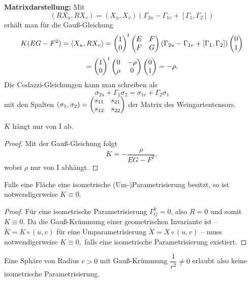 \textbf{Matrixdarstellung:} Mit 
		\[ (RX_u,RX_v)= (X_u,X_v)(\Gamma_{2u}-\Gamma_{1v} + [\Gamma_{1},\Gamma_{2}]) \] 
	erhält man für die Gauß-Gleichung 
		\[ K(EG-F^2) = \left \langle X_u,RX_v \right\rangle = \begin{pmatrix} 1 \\ 0 \end{pmatrix}^t\begin{pmatrix} E & F \\ F & G \end{pmatrix} ( \Gamma_{2u}-\Gamma_{1v} + [\Gamma_{1},\Gamma_{2}]) \begin{pmatrix} 0 \\ 1 \end{pmatrix} \]
		\[= \begin{pmatrix} 1 \\ 0 \end{pmatrix}^t \begin{pmatrix}  0 &- \rho \\ \rho & 0 \end{pmatrix} \begin{pmatrix} 0 \\ 1 \end{pmatrix} = -\rho. \] 
	Die Codazzi-Gleichungen kann man schreiben als 
		\[ \sigma_{2u}+\Gamma_{1}\sigma_{2} = \sigma_{1v}+\Gamma_{2}\sigma_{1} \]
	mit den Spalten $ (\sigma_{1},\sigma_{2}) = \begin{pmatrix} s_{11} & s_{21} \\ s_{12} & s_{22}  \end{pmatrix} $ der Matrix des Weingartentensors.
	
\begin{theorem}
	$K$ hängt nur von $ \mathrm{I} $ ab.
\end{theorem}

\begin{proof}
	
	Mit der Gauß-Gleichung folgt
		\[K = -\dfrac{\rho}{EG-F^2}, \]
	wobei $ \rho $ nur von $ \mathrm{I} $ abhängt.
	
\end{proof}

\begin{corollary}
	Falls eine Fläche eine isometrische (Um-)Parametrisierung besitzt, so ist notwendigerweise $ K \equiv 0 $.
\end{corollary}

\begin{proof}
	
	Für eine isometrische Parametrisierung $ \Gamma_{ij}^k = 0 $, also $ R = 0 $ und somit $ K \equiv 0. $
	Da die Gauß-Krümmung einer geometrischen Invariante ist -- $ \widetilde{K} = K \circ (u,v) $ für eine Umparametrisierung $ \widetilde{X}=X \circ(u,v) $ -- muss notwendigerweise $ K \equiv 0, $ falls eine isometrische Parametrisierung existiert.	
\end{proof}

\begin{example}
	
	Eine Sphäre von Radius $ r > 0 $ mit Gauß-Krümmung $ \dfrac{1}{r^2} \neq 0 $ erlaubt also keine isometrische Parametrisierung.
	
\end{example}

